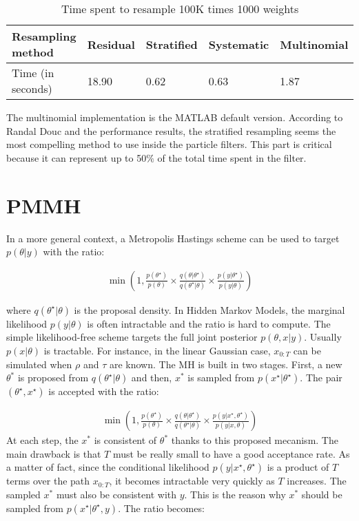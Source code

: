 \documentclass[11pt,a4,twosided,singlespacing,titlepagenumber=on]{scrreprt}
\numberwithin{equation}{chapter} %
\theoremstyle{remark}
\begin{document}
\begin{table}[h]
\centering
\label{table1}
\begin{tabular}{|l|l|l|l|l|}
\hline
Resampling method     & Residual & Stratified & Systematic & Multinomial \\ \hline
Time (in seconds) & 18.90    & 0.62       & 0.63       & 1.87        \\ \hline
\end{tabular}
\caption{Time spent to resample 100K times 1000 weights}
\end{table}
The multinomial implementation is the MATLAB default version. According to Randal Douc and the performance results, the stratified resampling seems the most compelling method to use inside the particle filters. This part is critical because it can represent up to 50$\%$ of the total time spent in the filter.

\section{PMMH}

In a more general context, a Metropolis Hastings scheme can be used to target $p(\theta| y)$ with the ratio:

\begin{align*}
\min \left( 1, \frac{p(\theta^\star)}{p(\theta)} \times  \frac{q(\theta|\theta^\star)}{q(\theta^\star|\theta)} \times \frac{p({y}|\theta^\star)}{p({y}|\theta)} \right)
\end{align*}

where $q(\theta^\star|\theta)$ is the proposal density. In Hidden Markov Models, the marginal likelihood $p(y|\theta)$ is often intractable and the ratio is hard to compute. The simple likelihood-free scheme targets the full joint posterior $p(\theta,x|y)$. Usually $p(x|\theta)$ is tractable. For instance, in the linear Gaussian case, $x_{0:T}$ can be simulated when $\rho$ and $\tau$ are known. The MH is built in two stages. First, a new $\theta^*$ is proposed from $q(\theta^\star|\theta)$ and then, $x^*$ is sampled from $p(x^\star|\theta^\star)$. The pair $(\theta^\star,x^\star)$ is accepted with the ratio:

\begin{align*}
\min \left( 1, \frac{p(\theta^\star)}{p(\theta)} \times  \frac{q(\theta|\theta^\star)}{q(\theta^\star|\theta)} \times \frac{p(y|{x}^\star,\theta^\star)}{p(y|{x},\theta)} \right)
\end{align*}
At each step, the $x^*$ is consistent of $\theta^*$ thanks to this proposed mecanism. The main drawback is that $T$ must be really small to have a good acceptance rate. As a matter of fact, since the conditional likelihood $p(y|{x}^\star,\theta^\star)$ is a product of $T$ terms over the path $x_{0:T}$, it becomes intractable very quickly as $T$ increases. The sampled $x^*$ must also be consistent with $y$. This is the reason why $x^*$ should be sampled from $p(x^\star|\theta^\star,y)$. The ratio becomes:
\end{document}
